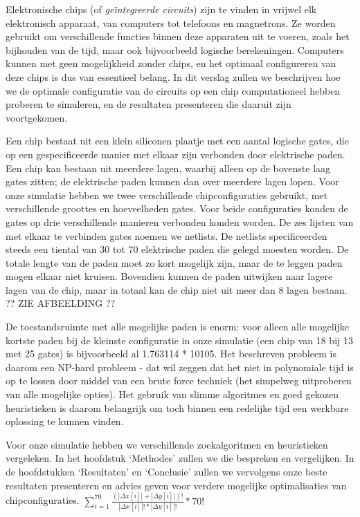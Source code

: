 \documentclass{article}
\begin{document}
	Elektronische chips (of \textit{ge\"\i ntegreerde circuits}) zijn te vinden in vrijwel elk elektronisch apparaat, van computers tot telefoons en magnetrons. Ze worden gebruikt om verschillende functies binnen deze apparaten uit te voeren, zoals het bijhouden van de tijd, maar ook bijvoorbeeld logische berekeningen. Computers kunnen met geen mogelijkheid zonder chips, en het optimaal configureren van deze chips is dus van essentieel belang. In dit verslag zullen we beschrijven hoe we de optimale configuratie van de circuits op een chip computationeel hebben proberen te simuleren, en de resultaten presenteren die daaruit zijn voortgekomen.
	\par
	Een chip bestaat uit een klein siliconen plaatje met een aantal logische gates, die op een gespecificeerde manier met elkaar zijn verbonden door elektrische paden. Een chip kan bestaan uit meerdere lagen, waarbij alleen op de bovenste laag gates zitten; de elektrische paden kunnen dan over meerdere lagen lopen. Voor onze simulatie hebben we twee verschillende chipconfiguraties gebruikt, met verschillende groottes en hoeveelheden gates. Voor beide configuraties konden de gates op drie verschillende manieren verbonden konden worden. De zes lijsten van met elkaar te verbinden gates noemen we netlists. De netlists specificeerden steeds een tiental van 30 tot 70 elektrische paden die gelegd moesten worden. De totale lengte van de paden moet zo kort mogelijk zijn, maar de te leggen paden mogen elkaar niet kruisen. Bovendien kunnen de paden uitwijken naar lagere lagen van de chip, maar in totaal kan de chip niet uit meer dan 8 lagen bestaan. ?? ZIE AFBEELDING ??
	\par
	De toestandsruimte met alle mogelijke paden is enorm: voor alleen alle mogelijke kortste paden bij de kleinste configuratie in onze simulatie (een chip van 18 bij 13 met 25 gates) is bijvoorbeeld al 1.763114 * 10105. Het beschreven probleem is daarom een NP-hard probleem - dat wil zeggen dat het niet in polynomiale tijd is op te lossen door middel van een brute force techniek (het simpelweg uitproberen van alle mogelijke opties). Het gebruik van slimme algoritmes en goed gekozen heuristieken is daarom belangrijk om toch binnen een redelijke tijd een werkbare oplossing te kunnen vinden.
	\par
	Voor onze simulatie hebben we verschillende zoekalgoritmen en heuristieken vergeleken. In het hoofdstuk ‘Methodes’ zullen we die bespreken en vergelijken. In de hoofdstukken ‘Resultaten’ en ‘Conclusie’ zullen we vervolgens onze beste resultaten presenteren en advies geven voor verdere mogelijke optimalisaties van chipconfiguraties.
	$\sum_{i=1}^{70} \frac{(|\Delta x[i]| + |\Delta y[i]|)!}{|\Delta x[i]|! * |\Delta y[i]|!} * 70!$
	
\end{document}
